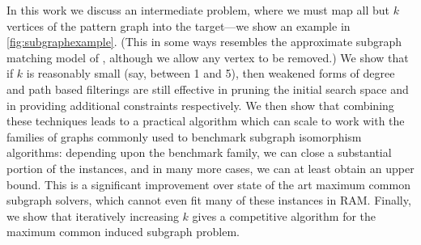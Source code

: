 \documentclass[letterpaper]{article}
\newcommand{\citet}[1]{\citeauthor{#1} \shortcite{#1}}
\theoremstyle{definition}
\begin{document}
In this work we discuss an intermediate problem, where we must map all but $k$ vertices of the
pattern graph into the target---we show an example in \cref{fig:subgraphexample}. (This in some
ways resembles the approximate subgraph matching model of \citet{DBLP:conf/cp/ZampelliDD05},
although we allow any vertex to be removed.) We show that if $k$ is reasonably small (say, between 1
and 5), then weakened forms of degree and path based filterings are still effective in pruning the
initial search space and in providing additional constraints respectively. We then show that
combining these techniques leads to a practical algorithm which can scale to work with the families
of graphs commonly used to benchmark subgraph isomorphism algorithms: depending upon the benchmark
family, we can close a substantial portion of the instances, and in many more cases, we can at least
obtain an upper bound. This is a significant improvement over state of the art maximum common
subgraph solvers, which cannot even fit many of these instances in RAM. Finally, we show that
iteratively increasing $k$ gives a competitive algorithm for the maximum common induced subgraph
problem.
\end{document}
